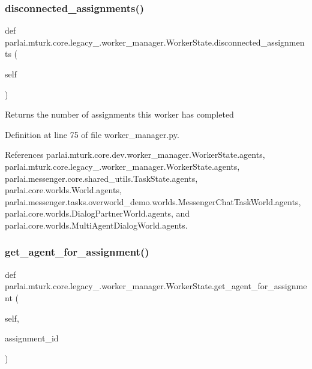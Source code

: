 \subsubsection{\texorpdfstring{disconnected\+\_\+assignments()}{disconnected\_assignments()}}
{\footnotesize\ttfamily def parlai.\+mturk.\+core.\+legacy\+\_.\+worker\+\_\+manager.\+Worker\+State.\+disconnected\+\_\+assignments (\begin{DoxyParamCaption}\item[{}]{self }\end{DoxyParamCaption})}

\begin{DoxyVerb}Returns the number of assignments this worker has completed\end{DoxyVerb}
 

Definition at line 75 of file worker\+\_\+manager.\+py.



References parlai.\+mturk.\+core.\+dev.\+worker\+\_\+manager.\+Worker\+State.\+agents, parlai.\+mturk.\+core.\+legacy\+\_.\+worker\+\_\+manager.\+Worker\+State.\+agents, parlai.\+messenger.\+core.\+shared\+\_\+utils.\+Task\+State.\+agents, parlai.\+core.\+worlds.\+World.\+agents, parlai.\+messenger.\+tasks.\+overworld\+\_\+demo.\+worlds.\+Messenger\+Chat\+Task\+World.\+agents, parlai.\+core.\+worlds.\+Dialog\+Partner\+World.\+agents, and parlai.\+core.\+worlds.\+Multi\+Agent\+Dialog\+World.\+agents.

\mbox{\label{classparlai_1_1mturk_1_1core_1_1legacy__2018_1_1worker__manager_1_1WorkerState_af5d8f601efd7223f5b2d91b2df3582e2}} 
\subsubsection{\texorpdfstring{get\+\_\+agent\+\_\+for\+\_\+assignment()}{get\_agent\_for\_assignment()}}
{\footnotesize\ttfamily def parlai.\+mturk.\+core.\+legacy\+\_.\+worker\+\_\+manager.\+Worker\+State.\+get\+\_\+agent\+\_\+for\+\_\+assignment (\begin{DoxyParamCaption}\item[{}]{self,  }\item[{}]{assignment\+\_\+id }\end{DoxyParamCaption})}



